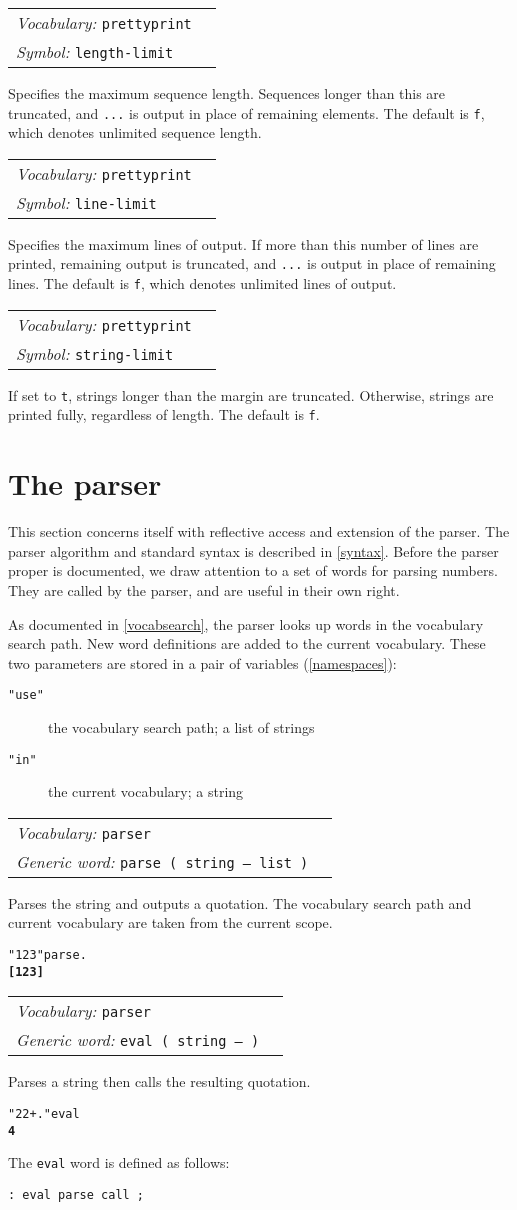 \documentclass{book}
\newcommand{\vocabulary}[1]{\emph{Vocabulary:} \texttt{#1}&\\}
\newcommand{\symbolword}[1]{\index{\texttt{#1}}\emph{Symbol:} \texttt{#1}&\\}
\newcommand{\genericword}[2]{\index{\texttt{#1}}\emph{Generic word:} \texttt{#2}&\\}
\newcommand{\wordtable}[1]{


\begin{tabularx}{12cm}{lX}
\hline
#1
\hline
\end{tabularx}

}
\begin{document}
\wordtable{
\vocabulary{prettyprint}
\symbolword{length-limit}
}
Specifies the maximum sequence length. Sequences longer than this are truncated, and \verb|...| is output in place of remaining elements. The default is \texttt{f}, which denotes unlimited sequence length.

\wordtable{
\vocabulary{prettyprint}
\symbolword{line-limit}
}
Specifies the maximum lines of output. If more than this number of lines are printed, remaining output is truncated, and \verb|...| is output in place of remaining lines. The default is \texttt{f}, which denotes unlimited lines of output.

\wordtable{
\vocabulary{prettyprint}
\symbolword{string-limit}
}
If set to \verb|t|, strings longer than the margin are truncated. Otherwise, strings are printed fully, regardless of length. The default is \verb|f|.

\chapter{The parser}

This section concerns itself with reflective access and extension of the parser. The parser algorithm and standard syntax is described in \ref{syntax}. Before the parser proper is documented, we draw attention to a set of words for parsing numbers. They are called by the parser, and are useful in their own right.

As documented in \ref{vocabsearch}, the parser looks up words in the vocabulary search path. New word definitions are added to the current vocabulary. These two parameters are stored in a pair of variables (\ref{namespaces}):
\begin{description}
\item[\texttt{"use"}] the vocabulary search path; a list of strings
\item[\texttt{"in"}] the current vocabulary; a string
\end{description}

\wordtable{
\vocabulary{parser}
\genericword{parse}{parse~( string -- list )}
}
Parses the string and outputs a quotation. The vocabulary search path and current vocabulary are taken from the current scope.
\begin{alltt}
  "1 2 3" parse .
\textbf{[ 1 2 3 ]}
\end{alltt}

\wordtable{
\vocabulary{parser}
\genericword{eval}{eval~( string -- )}
}
Parses a string then calls the resulting quotation.
\begin{alltt}
  "2 2 + ." eval
\textbf{4}
\end{alltt}
The \texttt{eval} word is defined as follows:
\begin{verbatim}
: eval parse call ;
\end{verbatim}
\end{document}
